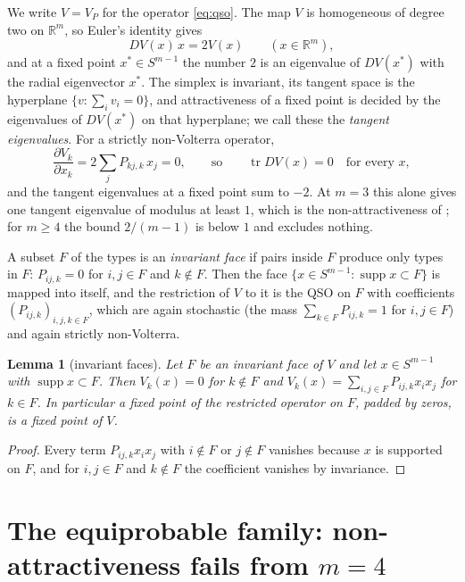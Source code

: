 \documentclass[11pt]{amsart}
\newtheorem{lemma}[theorem]{Lemma}
\theoremstyle{definition}
\newcommand{\R}{\mathbb{R}}
\newcommand{\Simp}{S^{m-1}}
\DeclareMathOperator{\supp}{supp}
\DeclareMathOperator{\tr}{tr}
\begin{document}
We write $V=V_P$ for the operator \eqref{eq:qso}. The map $V$ is homogeneous of degree two on $\R^m$, so Euler's identity gives
\begin{equation}\label{eq:euler}
DV(x)\,x=2V(x)\qquad(x\in\R^m),
\end{equation}
and at a fixed point $x^*\in\Simp$ the number $2$ is an eigenvalue of $DV(x^*)$ with the radial eigenvector $x^*$. The simplex is invariant, its tangent space is the hyperplane $\{v:\sum_iv_i=0\}$, and attractiveness of a fixed point is decided by the eigenvalues of $DV(x^*)$ on that hyperplane; we call these the \emph{tangent eigenvalues}. For a strictly non-Volterra operator,
\begin{equation}\label{eq:trace}
\frac{\partial V_k}{\partial x_k}=2\sum_jP_{kj,k}\,x_j=0,\qquad\text{so}\qquad \tr DV(x)=0\quad\text{for every }x,
\end{equation}
and the tangent eigenvalues at a fixed point sum to $-2$. At $m=3$ this alone gives one tangent eigenvalue of modulus at least $1$, which is the non-attractiveness of ; for $m\ge4$ the bound $2/(m-1)$ is below $1$ and excludes nothing.

A subset $F$ of the types is an \emph{invariant face} if pairs inside $F$ produce only types in $F$: $P_{ij,k}=0$ for $i,j\in F$ and $k\notin F$. Then the face $\{x\in\Simp:\supp x\subset F\}$ is mapped into itself, and the restriction of $V$ to it is the QSO on $F$ with coefficients $(P_{ij,k})_{i,j,k\in F}$, which are again stochastic (the mass $\sum_{k\in F}P_{ij,k}=1$ for $i,j\in F$) and again strictly non-Volterra.

\begin{lemma}[invariant faces]\label{lem:face}
Let $F$ be an invariant face of $V$ and let $x\in\Simp$ with $\supp x\subset F$. Then $V_k(x)=0$ for $k\notin F$ and $V_k(x)=\sum_{i,j\in F}P_{ij,k}x_ix_j$ for $k\in F$. In particular a fixed point of the restricted operator on $F$, padded by zeros, is a fixed point of $V$.
\end{lemma}

\begin{proof}
Every term $P_{ij,k}x_ix_j$ with $i\notin F$ or $j\notin F$ vanishes because $x$ is supported on $F$, and for $i,j\in F$ and $k\notin F$ the coefficient vanishes by invariance.
\end{proof}

\section{The equiprobable family: non-attractiveness fails from $m=4$}\label{sec:equi}
\end{document}

